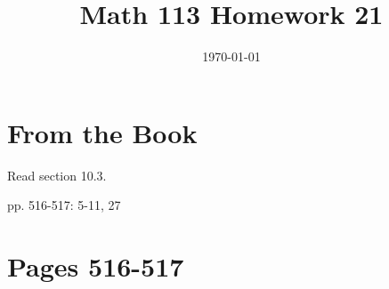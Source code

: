 \documentclass[fleqn,addpoints]{exam}
\title{Math 113 Homework 21}
\author{}
\date{\today}
\begin{document}
\maketitle

\section{From the Book}

Read section 10.3.

\begin{itemize*}
  \item pp. 516-517: 5-11, 27
\end{itemize*}

\ifprintanswers
\section{Pages 516-517}
\end{document}

